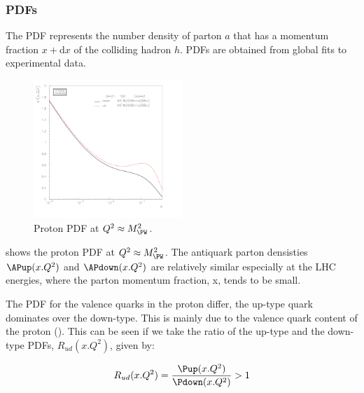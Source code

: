 

\subsubsection*{\acp{PDF}} 
The \ac{PDF} represents the number density of parton $a$ that has a momentum
fraction $x+\mathrm{d}x$ of the colliding hadron $h$.  \acp{PDF} are obtained
from global fits to experimental data. %

\begin{figure}[htb]
  \centering
  \includegraphics[width=0.5\textwidth]{plot_pdf}
  \caption{Proton PDF at $Q^2\approx M_{\PW}^2$.}
  \label{wbos:pdf}
\end{figure}

 shows the proton PDF at $Q^2\approx M_{\PW}^2$.  The
antiquark parton densisties $\APup(x.Q^2)$ and $\APdown(x.Q^2)$ are relatively
similar especially at the LHC energies, where the parton momentum fraction, x,
tends to be small.

The \ac{PDF} for the valence quarks in the proton differ, the up-type quark
dominates over the down-type. This is mainly due to the valence quark content
of the proton (\HepProcess{\Pup\Pup\Pdown}).  This can be seen if we take the
ratio of the up-type and the down-type \acp{PDF}, $R_{ud}(x.Q^2)$, given by:

\begin{equation}
  R_{ud}(x.Q^2) = \frac{\Pup(x.Q^2)}{ \Pdown(x.Q^2)} > 1
\end{equation}

